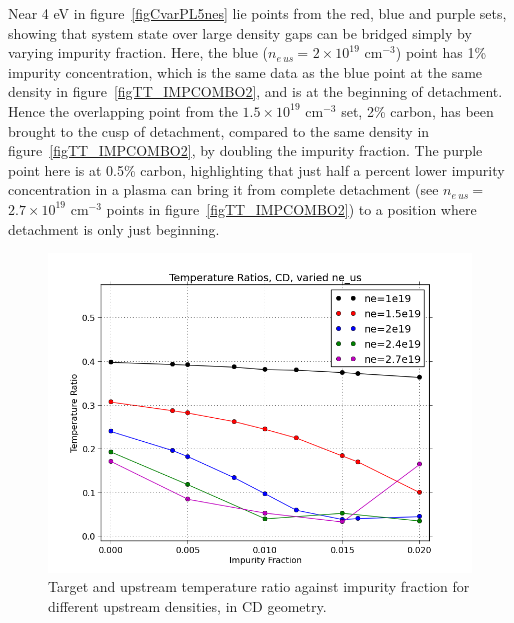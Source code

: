 \documentclass[12pt]{article}  %
\providecommand{\noNe}[1]{{${#1}\times 10^{19}$ cm$^{-3}$}} %
\providecommand{\neus}{$n_{e~us}~$} %
\begin{document}
Near 4 eV in figure~\ref{figCvarPL5nes} lie points from the red, blue and purple sets, showing that system state over large density gaps can be bridged simply by varying impurity fraction. Here, the blue (\neus = \noNe{2}) point has 1\% impurity concentration, which is the same data as the blue point at the same density in figure~\ref{figTT_IMPCOMBO2}, and is at the beginning of detachment. Hence the overlapping point from the \noNe{1.5} set, 2\% carbon, has been brought to the cusp of detachment, compared to the same density in figure~\ref{figTT_IMPCOMBO2}, by doubling the impurity fraction. The purple point here is at 0.5\% carbon, highlighting that just half a percent lower impurity concentration in a plasma can bring it from complete detachment (see \neus = \noNe{2.7} points in figure~\ref{figTT_IMPCOMBO2}) to a position where detachment is only just beginning.

\begin{figure}
\includegraphics[scale=0.5]{Figures/sol1d/CvarTR5nes.png}
\centering
\caption{Target and upstream temperature ratio against impurity fraction for different upstream densities, in CD geometry.}\label{figCvarTR5nes}
\end{figure}
\end{document}
